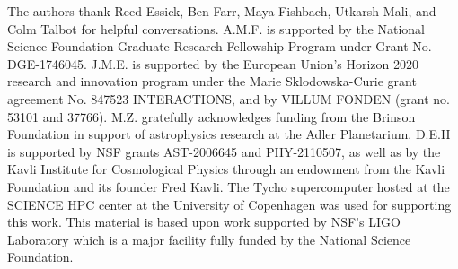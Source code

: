 \documentclass[preprint2,linenumbers]{aastex631}
\begin{document}
\begin{acknowledgments}
    The authors thank Reed Essick, Ben Farr, Maya Fishbach, Utkarsh Mali, and Colm Talbot for helpful conversations. 
    A.M.F. is supported by the National Science Foundation Graduate Research Fellowship Program under Grant No. DGE-1746045.
    J.M.E. is supported by the European Union’s Horizon 2020 research and innovation program under the Marie Sklodowska-Curie grant agreement No. 847523 INTERACTIONS, and by VILLUM FONDEN (grant no. 53101 and 37766). 
    M.Z. gratefully acknowledges funding from the Brinson Foundation in support of astrophysics research at the Adler Planetarium.
    D.E.H is supported by NSF grants AST-2006645 and PHY-2110507, as well as by the Kavli Institute for Cosmological Physics through an endowment from the Kavli Foundation and its founder Fred Kavli.
    The Tycho supercomputer hosted at the SCIENCE HPC center at the University of Copenhagen was used for supporting this work.
    This material is based upon work supported by NSF's LIGO Laboratory which is a major facility fully funded by the National Science Foundation.
\end{acknowledgments}



\appendix
\end{document}
